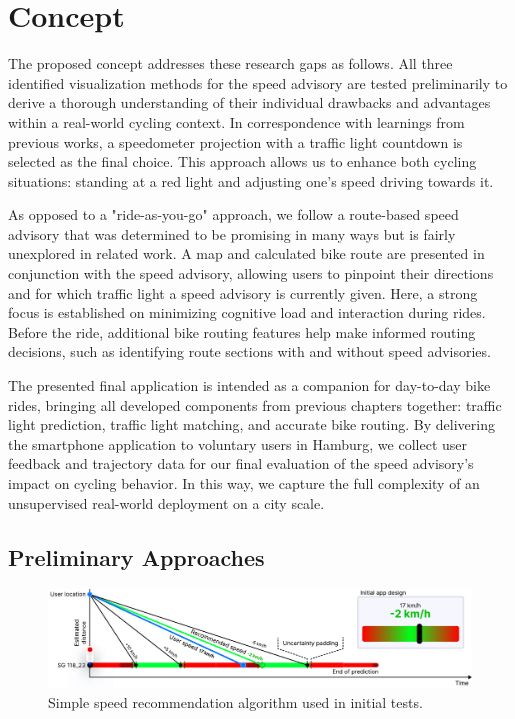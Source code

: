 \section{Concept}

The proposed concept addresses these research gaps as follows. All three identified visualization methods for the speed advisory are tested preliminarily to derive a thorough understanding of their individual drawbacks and advantages within a real-world cycling context. In correspondence with learnings from previous works, a speedometer projection with a traffic light countdown is selected as the final choice. This approach allows us to enhance both cycling situations: standing at a red light and adjusting one's speed driving towards it.

As opposed to a "ride-as-you-go" approach, we follow a route-based speed advisory that was determined to be promising in many ways but is fairly unexplored in related work. A map and calculated bike route are presented in conjunction with the speed advisory, allowing users to pinpoint their directions and for which traffic light a speed advisory is currently given. Here, a strong focus is established on minimizing cognitive load and interaction during rides. Before the ride, additional bike routing features help make informed routing decisions, such as identifying route sections with and without speed advisories. 

The presented final application is intended as a companion for day-to-day bike rides, bringing all developed components from previous chapters together: traffic light prediction, traffic light matching, and accurate bike routing. By delivering the smartphone application to voluntary users in Hamburg, we collect user feedback and trajectory data for our final evaluation of the speed advisory's impact on cycling behavior. In this way, we capture the full complexity of an unsupervised real-world deployment on a city scale.

\subsection{Preliminary Approaches}

\begin{figure}[t]
\centering
\includegraphics[width=\linewidth]{images/graph-based-speed-recommendation.pdf}
\caption{Simple speed recommendation algorithm used in initial tests.}
\label{fig:graph-based-speed-recommendation}
\end{figure}

